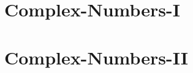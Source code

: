 \documentclass{beamer}
\begin{document}





\part{Complex-Numbers-I}



\part{Complex-Numbers-II}







\newcommand{\arrayTwo}[4]{
  \left[
  \begin{array}{rr}
    #1 & #2 \\
    #3 & #4
  \end{array}
  \right]
}

\newcommand{\vecTwo}[2]{
  \left[
  \begin{array}{r}
    #1 \\  #2
  \end{array}
  \right]
}


\newcommand{\stateTwo}[2]{
  \begin{array}{rr}
    \mbox{\fontsize{6}{6}\selectfont $#1$} \\  \mbox{\fontsize{6}{6}\selectfont $#2$}
  \end{array}
}


\newcommand{\arrayThree}[9]{
  \left[
    \begin{array}{rrr}
      #1 & #2 & #3 \\
      #4 & #5 & #6 \\
      #7 & #8 & #9
    \end{array}
  \right]
}

\newcommand{\startRowOps}{
  \left[
    \begin{array}{rrr|r}
}

\newcommand{\oneRowOps}[4] {
      #1 & #2 & #3 & #4 \\
}

\newcommand{\stopRowOps}{
    \end{array}
  \right]
}
\end{document}
